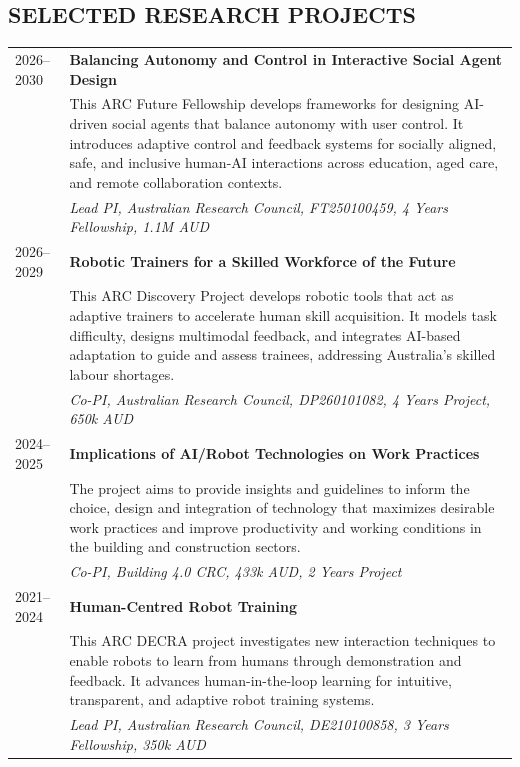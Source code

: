 
\subsection{SELECTED RESEARCH PROJECTS}
\vspace{2pt}

\noindent
\begin{tabularx}{\textwidth}{@{}lX@{}}
2026--2030 & \textbf{Balancing Autonomy and Control in Interactive Social Agent Design} \\
           & This ARC Future Fellowship develops frameworks for designing AI-driven social agents that balance autonomy with user control. It introduces adaptive control and feedback systems for socially aligned, safe, and inclusive human-AI interactions across education, aged care, and remote collaboration contexts. \\
           & \textit{Lead PI, Australian Research Council, FT250100459, 4 Years Fellowship, 1.1M AUD} \\[3pt]

2026--2029 & \textbf{Robotic Trainers for a Skilled Workforce of the Future} \\
           & This ARC Discovery Project develops robotic tools that act as adaptive trainers to accelerate human skill acquisition. It models task difficulty, designs multimodal feedback, and integrates AI-based adaptation to guide and assess trainees, addressing Australia's skilled labour shortages. \\
           & \textit{Co-PI, Australian Research Council, DP260101082, 4 Years Project, 650k AUD} \\[3pt]

2024--2025 & \textbf{Implications of AI/Robot Technologies on Work Practices} \\
           & The project aims to provide insights and guidelines to inform the choice, design and integration of technology that maximizes desirable work practices and improve productivity and working conditions in the building and construction sectors. \\
           & \textit{Co-PI, Building 4.0 CRC, 433k AUD, 2 Years Project} \\[3pt]

2021--2024 & \textbf{Human-Centred Robot Training} \\
           & This ARC DECRA project investigates new interaction techniques to enable robots to learn from humans through demonstration and feedback. It advances human-in-the-loop learning for intuitive, transparent, and adaptive robot training systems. \\
           & \textit{Lead PI, Australian Research Council, DE210100858, 3 Years Fellowship, 350k AUD} \\
\end{tabularx}

